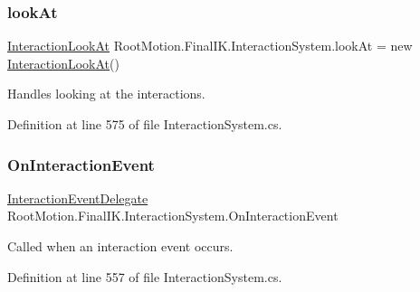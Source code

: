 \mbox{\label{class_root_motion_1_1_final_i_k_1_1_interaction_system_a25a728acce090cdf0acfcc96ccc7f5dd}} 
\subsubsection{\texorpdfstring{look\+At}{lookAt}}
{\footnotesize\ttfamily \mbox{\hyperlink{class_root_motion_1_1_final_i_k_1_1_interaction_look_at}{Interaction\+Look\+At}} Root\+Motion.\+Final\+I\+K.\+Interaction\+System.\+look\+At = new \mbox{\hyperlink{class_root_motion_1_1_final_i_k_1_1_interaction_look_at}{Interaction\+Look\+At}}()}



Handles looking at the interactions. 



Definition at line 575 of file Interaction\+System.\+cs.

\mbox{\label{class_root_motion_1_1_final_i_k_1_1_interaction_system_a58f3fbe2e590a55017cb49cfb8de7ebb}} 
\subsubsection{\texorpdfstring{On\+Interaction\+Event}{OnInteractionEvent}}
{\footnotesize\ttfamily \mbox{\hyperlink{class_root_motion_1_1_final_i_k_1_1_interaction_system_ae04cc230b351d4b73458372899d3f6d8}{Interaction\+Event\+Delegate}} Root\+Motion.\+Final\+I\+K.\+Interaction\+System.\+On\+Interaction\+Event}



Called when an interaction event occurs. 



Definition at line 557 of file Interaction\+System.\+cs.

